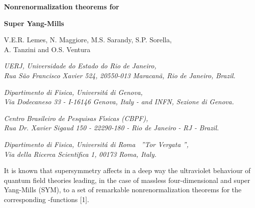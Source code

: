 \documentclass[a4paper,a4paper]{article}
\begin{document}
\begin{center}
{\LARGE {\bf Nonrenormalization theorems for  }}

\vspace{2mm}

{\LARGE {\bf {}\coordHE{} Super Yang-Mills }}
 
\vspace{5mm} 

{\large V.E.R. Lemes\coordHE{}, N. Maggiore\coordHE{}, 
M.S. Sarandy\coordHE{}, S.P. Sorella\coordHE{}, \\ A. Tanzini\coordHE{} and 
O.S. Ventura\coordHE{}}   
\vspace{5mm}

\coordHE{} {\it UERJ, Universidade do Estado do Rio de Janeiro, \\
Rua S\~{a}o Francisco Xavier 524, 20550-013 Maracan\~{a}, Rio de Janeiro, Brazil.}

\vspace{3mm}

\coordHE{} {\it Dipartimento di Fisica, Universit\'{a}
di Genova, \\ 
Via Dodecaneso 33 - I-16146 Genova, Italy - and INFN, Sezione di Genova.}

\vspace{3mm}

\coordHE{} {\it Centro Brasileiro de Pesquisas F\'\i sicas (CBPF), 
\\Rua Dr. Xavier Sigaud 150 - 22290-180 - Rio de Janeiro - RJ - Brazil.}

\vspace{3mm} 

\coordHE{} {\it Dipartimento di Fisica, Universit\'{a}
di Roma \ ''Tor Vergata '', 
\\Via della Ricerca Scientifica 1, 00173 Roma, Italy.}

\end{center}

\vspace{1cm}

It is known that supersymmetry affects in a deep way the
ultraviolet behaviour of quantum field theories leading, in the case of massless 
four-dimensional \coordHE{} and \coordHE{} super Yang-Mills (SYM), to a set of
remarkable nonrenormalization theorems for the corresponding \coordHE{}%
-functions [1]. 
\end{document}
